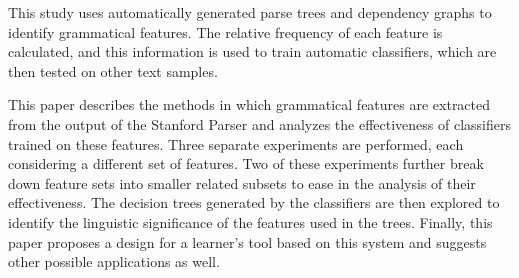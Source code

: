 \documentclass[main.tex]{subfiles}
\begin{document}
This study uses automatically generated parse trees and dependency graphs to identify grammatical features. The relative frequency of each feature is calculated, and this information is used to train automatic classifiers, which are then tested on other text samples. 

This paper describes the methods in which grammatical features are extracted from the output of the Stanford Parser and analyzes the effectiveness of classifiers trained on these features. Three separate experiments are performed, each considering a different set of features. Two of these experiments further break down feature sets into smaller related subsets to ease in the analysis of their effectiveness. The decision trees generated by the classifiers are then explored to identify the linguistic significance of the features used in the trees. Finally, this paper proposes a design for a learner's tool based on this system and suggests other possible applications as well.
\biblio
\end{document}
